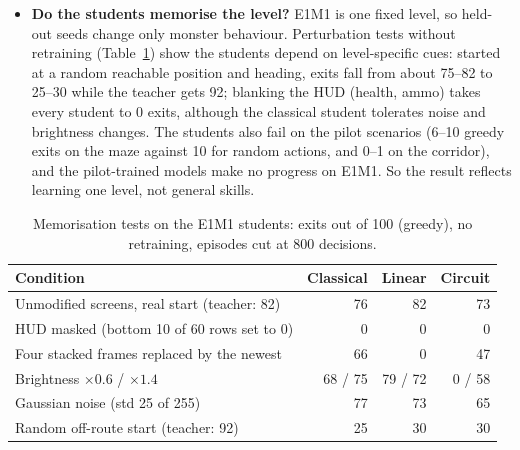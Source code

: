\documentclass[10pt, a4paper]{article}
\begin{document}
\begin{itemize}
    \item \textbf{Do the students memorise the level?} E1M1 is one fixed level, so held-out seeds change only monster behaviour. Perturbation tests without retraining (Table~\ref{tab:robust}) show the students depend on level-specific cues: started at a random reachable position and heading, exits fall from about 75--82 to 25--30 while the teacher gets 92; blanking the HUD (health, ammo) takes every student to 0 exits, although the classical student tolerates noise and brightness changes. The students also fail on the pilot scenarios (6--10 greedy exits on the maze against 10 for random actions, and 0--1 on the corridor), and the pilot-trained models make no progress on E1M1. So the result reflects learning one level, not general skills.
\end{itemize}

\begin{table}[htbp]
\centering
\footnotesize
\renewcommand{\arraystretch}{1.1}
\caption{Memorisation tests on the E1M1 students: exits out of 100 (greedy), no retraining, episodes cut at 800 decisions.}
\label{tab:robust}
\begin{tabularx}{\textwidth}{Xrrr}
\toprule
\textbf{Condition} & \textbf{Classical} & \textbf{Linear} & \textbf{Circuit} \\
\midrule
Unmodified screens, real start (teacher: 82) & 76 & 82 & 73 \\
HUD masked (bottom 10 of 60 rows set to 0) & 0 & 0 & 0 \\
Four stacked frames replaced by the newest & 66 & 0 & 47 \\
Brightness $\times0.6$ / $\times1.4$ & 68 / 75 & 79 / 72 & 0 / 58 \\
Gaussian noise (std 25 of 255) & 77 & 73 & 65 \\
Random off-route start (teacher: 92) & 25 & 30 & 30 \\
\bottomrule
\end{tabularx}
\end{table}
\end{document}

